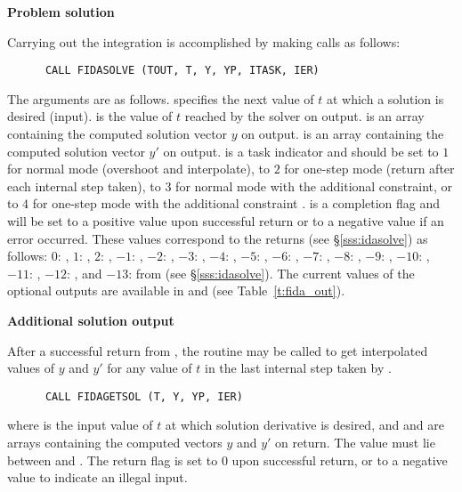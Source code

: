 \begin{Steps}
\item {\bf Problem solution}

  Carrying out the integration is accomplished by making calls as follows:
\begin{verbatim}
      CALL FIDASOLVE (TOUT, T, Y, YP, ITASK, IER)
\end{verbatim}
  The arguments are as follows.
   specifies the next value of $t$ at which a solution is desired (input).
   is the value of $t$ reached by the solver on output.
   is an array containing the computed solution vector $y$ on output.
   is an array containing the computed solution vector $y'$ on output.
   is a task indicator and should be set to $1$ for normal mode 
  (overshoot  and interpolate), to $2$ for one-step mode 
  (return after each internal step taken), to $3$ for normal mode with
  the additional  constraint, or to $4$ for one-step mode 
  with the additional constraint .
   is a completion flag and will be set to a positive value upon
  successful return or to a negative value if an error occurred. These values
  correspond to the  returns (see \S\ref{sss:idasolve}) as follows:
  $0$: , $1$: , $2$: ,
  $-1$: , $-2$: , $-3$: ,
  $-4$: , $-5$: ,
  $-6$: , $-7$: ,
  $-8$: , $-9$: ,
  $-10$: , $-11$: ,
  $-12$: , and
  $-13$:  from  (see \S\ref{sss:idasolve}).
  The current values of the optional outputs are available in  and
   (see Table~\ref{t:fida_out}).
  
\item {\bf Additional solution output}

  After a successful return from , the routine  may
  be called to get interpolated values of $y$ and $y'$ for any value of $t$ in
  the last internal step taken by {\ida}.
\begin{verbatim}
      CALL FIDAGETSOL (T, Y, YP, IER)
\end{verbatim}
  where
   is the input value of $t$ at which solution derivative is desired, and
   and  are arrays containing the computed vectors $y$ and $y'$
  on return.  The value  must lie between  and .
  The return flag  is set to $0$ upon successful return, or to a
  negative value to indicate an illegal input.
  

\end{Steps}
